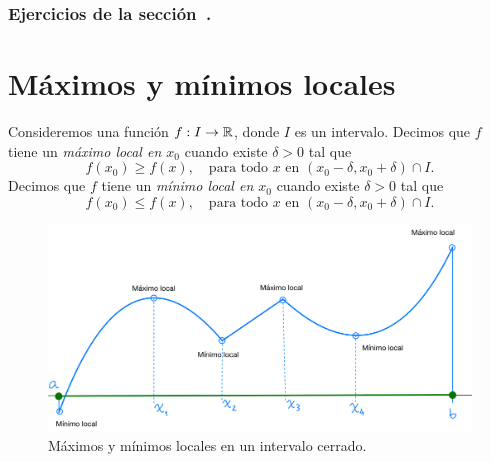 \subsubsection*{Ejercicios de la sección~.}

\begin{enumerate}

\end{enumerate}

\section{Máximos y mínimos locales}

\begin{definition}
    Consideremos una función $f:I\to \mathbb{R}$, donde $I$ es un intervalo.
    Decimos que $f$ tiene un \emph{máximo local en $x_0$} cuando existe $\delta>0$ tal que
    \[
    f(x_0)\ge f(x), \quad\text{para todo $x$ en $(x_0-\delta,x_0+\delta)\cap I$}.
    \]
    Decimos que $f$ tiene un \emph{mínimo local en $x_0$} cuando existe $\delta>0$ tal que
    \[
    f(x_0)\le f(x), \quad\text{para todo $x$ en $(x_0-\delta,x_0+\delta)\cap I$}.
    \]
\end{definition}

\begin{figure}[htbp]
    \centerline{\includegraphics[width=.8\textwidth]{pics/max-min-locales-int-cerrado.png}}
\caption{Máximos y mínimos locales en un intervalo cerrado.}
\end{figure}

